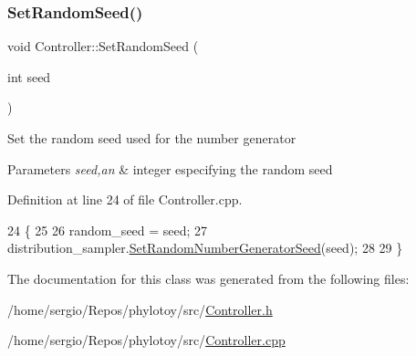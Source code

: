 \subsubsection{\texorpdfstring{Set\+Random\+Seed()}{SetRandomSeed()}}
{\footnotesize\ttfamily void Controller\+::\+Set\+Random\+Seed (\begin{DoxyParamCaption}\item[{int}]{seed }\end{DoxyParamCaption})}

Set the random seed used for the number generator 
\begin{DoxyParams}{Parameters}
{\em seed,an} & integer especifying the random seed \\
\hline
\end{DoxyParams}


Definition at line 24 of file Controller.\+cpp.


\begin{DoxyCode}
24                                        \{
25   
26   random\_seed = seed;
27   distribution\_sampler.\hyperlink{classDistributionSampler_ae5a6fec26e2dd0f149d3fc528a92ad4e}{SetRandomNumberGeneratorSeed}(seed);
28   
29 \}
\end{DoxyCode}


The documentation for this class was generated from the following files\+:\begin{DoxyCompactItemize}
\item 
/home/sergio/\+Repos/phylotoy/src/\hyperlink{Controller_8h}{Controller.\+h}\item 
/home/sergio/\+Repos/phylotoy/src/\hyperlink{Controller_8cpp}{Controller.\+cpp}\end{DoxyCompactItemize}

